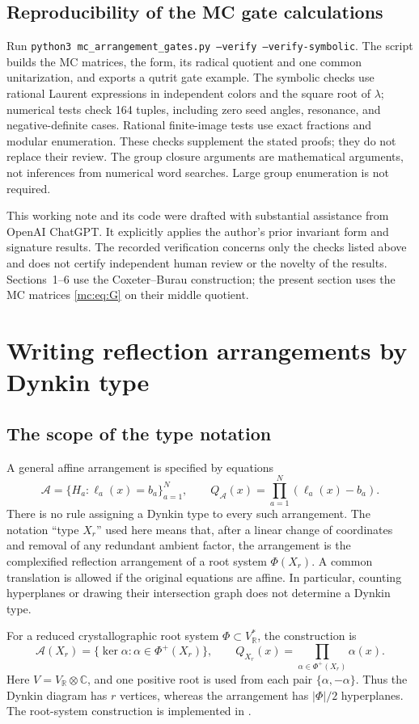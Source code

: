 \documentclass[11pt,a4paper]{article}
\theoremstyle{remark}\newtheorem{remark}[theorem]{Remark}
\newcommand{\C}{\mathbb C}
\newcommand{\A}{\mathcal A}
\begin{document}
\subsection{Reproducibility of the MC gate calculations}
Run \texttt{python3 mc\_arrangement\_gates.py --verify --verify-symbolic}.
The script builds the MC matrices, the form, its radical quotient and
one common unitarization, and exports a qutrit gate example. The symbolic
checks use rational Laurent expressions in independent colors and the
square root of $\lambda$; numerical tests check 164 tuples, including
zero seed angles, resonance, and negative-definite cases. Rational
finite-image tests use exact fractions and modular enumeration.
These checks supplement the stated proofs; they do not replace their
review. The group closure arguments are mathematical arguments, not
inferences from numerical word searches. Large group enumeration is
not required.

This working note and its code were drafted with substantial assistance
from OpenAI ChatGPT. It explicitly applies the author's prior invariant
form and signature results. The recorded verification concerns only the
checks listed above and does not certify independent human review or
the novelty of the results. Sections~1--6 use the Coxeter--Burau construction; the present
section uses the MC matrices \eqref{mc:eq:G} on their middle quotient.


\appendix
\section{Writing reflection arrangements by Dynkin type}\label{sec:dynkin}
\subsection*{The scope of the type notation}
A general affine arrangement is specified by equations
\[
\A=\{H_a:\ell_a(x)=b_a\}_{a=1}^N,
\qquad Q_{\A}(x)=\prod_{a=1}^N(\ell_a(x)-b_a).
\]
There is no rule assigning a Dynkin type to every such arrangement.
The notation ``type $X_r$'' used here means that, after a linear change
of coordinates and removal of any redundant ambient factor, the
arrangement is the complexified reflection arrangement of a root system
$\Phi(X_r)$.  A common translation is allowed if the original equations
are affine.  In particular, counting hyperplanes or drawing their
intersection graph does not determine a Dynkin type.

For a reduced crystallographic root system $\Phi\subset V_{\mathbb R}^*$,
the construction is
\begin{equation}\label{eq:root-arrangement}
\boxed{\quad \A(X_r)=\{\ker\alpha:\alpha\in\Phi^+(X_r)\},
\qquad Q_{X_r}(x)=\prod_{\alpha\in\Phi^+(X_r)}\alpha(x).\quad}
\end{equation}
Here $V=V_{\mathbb R}\otimes\C$, and one positive root is used from
each pair $\{\alpha,-\alpha\}$.  Thus the Dynkin diagram has $r$
vertices, whereas the arrangement has $|\Phi|/2$ hyperplanes.
The root-system construction is implemented in \cite{SageArr}.
\end{document}
